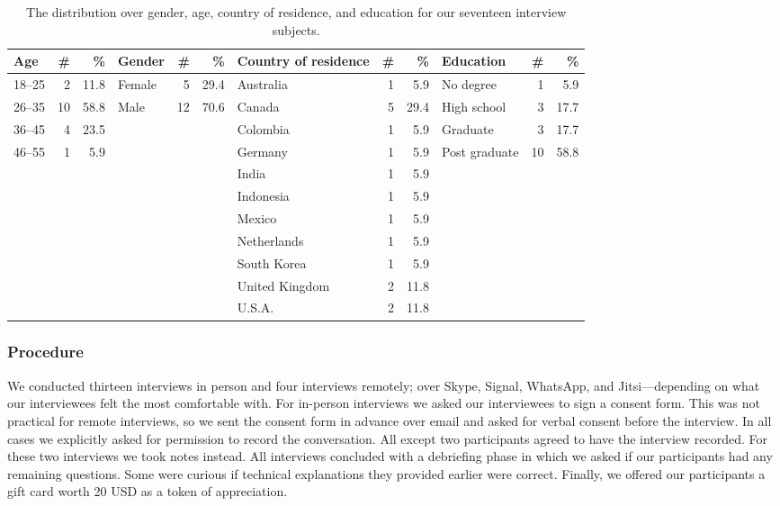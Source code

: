 \begin{table*}[ht]
    \centering
    \begin{tabular}{l r r l r r l r r l r r}
    \toprule
    Age & \# & \% &
    Gender & \# & \% &
    Country of residence & \# & \% &
    Education & \# & \% \\
    \midrule
    18--25 & 2  & 11.8 & Female & 5  & 29.4 & Australia      & 1 & 5.9  & No degree     & 1  & 5.9 \\
    26--35 & 10 & 58.8 & Male   & 12 & 70.6 & Canada         & 5 & 29.4 & High school   & 3  & 17.7 \\
    36--45 & 4  & 23.5 &        &    &      & Colombia       & 1 & 5.9  & Graduate      & 3  & 17.7 \\
    46--55 & 1  & 5.9  &        &    &      & Germany        & 1 & 5.9  & Post graduate & 10 & 58.8 \\
           &    &      &        &    &      & India          & 1 & 5.9  & & & \\
           &    &      &        &    &      & Indonesia      & 1 & 5.9  & & & \\
           &    &      &        &    &      & Mexico         & 1 & 5.9  & & & \\
           &    &      &        &    &      & Netherlands    & 1 & 5.9  & & & \\
           &    &      &        &    &      & South Korea    & 1 & 5.9  & & & \\
           &    &      &        &    &      & United Kingdom & 2 & 11.8 & & & \\
           &    &      &        &    &      & U.S.A.         & 2 & 11.8 & & & \\
    \bottomrule
    \end{tabular}
    \caption{The distribution over gender, age, country of residence, and
    education for our seventeen interview subjects.}
    \label{tab:interviewees}
\end{table*}

\subsubsection{Procedure}

We conducted thirteen interviews in person and four interviews remotely; over
Skype, Signal, WhatsApp, and Jitsi---depending on what our interviewees felt
the most comfortable with.  For in-person interviews we asked our interviewees
to sign a consent form.  This was not practical for remote interviews, so we
sent the consent form in advance over email and asked for verbal consent before
the interview.  In all cases we explicitly asked for permission to record the
conversation.  All except two participants agreed to have the interview
recorded.  For these two interviews we took notes instead.  All interviews
concluded with a debriefing phase in which we asked if our participants had any
remaining questions.  Some were curious if technical explanations they provided
earlier were correct.  Finally, we offered our participants a gift card worth
20 USD as a token of appreciation.

